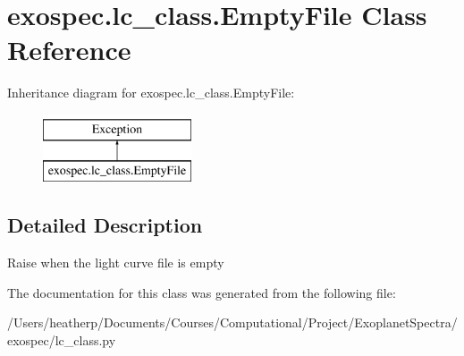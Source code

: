 \hypertarget{classexospec_1_1lc__class_1_1_empty_file}{}\section{exospec.\+lc\+\_\+class.\+Empty\+File Class Reference}
\label{classexospec_1_1lc__class_1_1_empty_file}
Inheritance diagram for exospec.\+lc\+\_\+class.\+Empty\+File\+:\begin{figure}[H]
\begin{center}
\leavevmode
\includegraphics[height=2.000000cm]{classexospec_1_1lc__class_1_1_empty_file}
\end{center}
\end{figure}


\subsection{Detailed Description}
\begin{DoxyVerb}Raise when the light curve file is empty\end{DoxyVerb}
 

The documentation for this class was generated from the following file\+:\begin{DoxyCompactItemize}
\item 
/\+Users/heatherp/\+Documents/\+Courses/\+Computational/\+Project/\+Exoplanet\+Spectra/exospec/lc\+\_\+class.\+py\end{DoxyCompactItemize}
